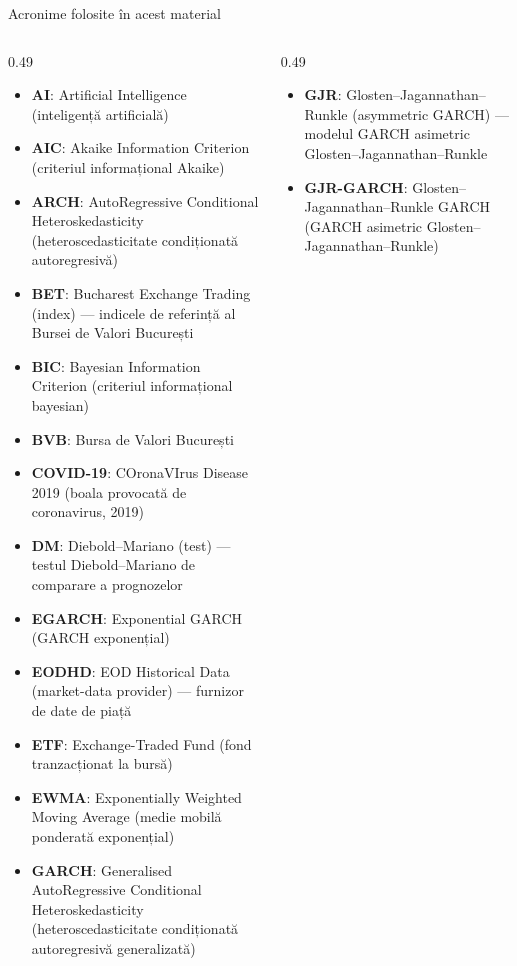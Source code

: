 \begin{frame}{Acronime folosite în acest material}
\begin{columns}[T]
\begin{column}{0.49\textwidth}
\begin{itemize}\setlength{\itemsep}{0pt}
    \item \textbf{AI}: Artificial Intelligence (inteligență artificială)
    \item \textbf{AIC}: Akaike Information Criterion (criteriul informațional Akaike)
    \item \textbf{ARCH}: AutoRegressive Conditional Heteroskedasticity (heteroscedasticitate condiționată autoregresivă)
    \item \textbf{BET}: Bucharest Exchange Trading (index) — indicele de referință al Bursei de Valori București
    \item \textbf{BIC}: Bayesian Information Criterion (criteriul informațional bayesian)
    \item \textbf{BVB}: Bursa de Valori București
    \item \textbf{COVID-19}: COronaVIrus Disease 2019 (boala provocată de coronavirus, 2019)
    \item \textbf{DM}: Diebold–Mariano (test) — testul Diebold–Mariano de comparare a prognozelor
    \item \textbf{EGARCH}: Exponential GARCH (GARCH exponențial)
    \item \textbf{EODHD}: EOD Historical Data (market-data provider) — furnizor de date de piață
    \item \textbf{ETF}: Exchange-Traded Fund (fond tranzacționat la bursă)
    \item \textbf{EWMA}: Exponentially Weighted Moving Average (medie mobilă ponderată exponențial)
    \item \textbf{GARCH}: Generalised AutoRegressive Conditional Heteroskedasticity (heteroscedasticitate condiționată autoregresivă generalizată)
\end{itemize}
\end{column}
\begin{column}{0.49\textwidth}
\begin{itemize}\setlength{\itemsep}{0pt}
    \item \textbf{GJR}: Glosten–Jagannathan–Runkle (asymmetric GARCH) — modelul GARCH asimetric Glosten–Jagannathan–Runkle
    \item \textbf{GJR-GARCH}: Glosten–Jagannathan–Runkle GARCH (GARCH asimetric Glosten–Jagannathan–Runkle)

\end{itemize}
\end{column}
\end{columns}
\end{frame}
